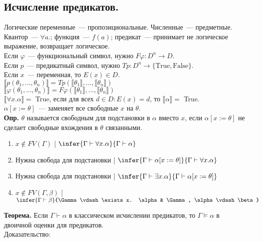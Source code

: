 \documentclass{article}
\begin{document}
	\subsection{Исчисление предикатов.}
	Логические переменные~--- пропозициональные. Численные~--- предметные. \\
	Квантор~--- $\forall a.$; функция~--- $f(a)$; предикат~--- принимает не логическое выражение, возвращает логическое. \\
	Если $\varphi$~--- функциональный символ, нужно $F\varphi: D^n \rightarrow D$. \\
	Если $p$~--- предикатный символ, нужно $Tp: D^n \rightarrow \{ \text{True}, \text{False} \}$. \\
	Если $x$~--- переменная, то $E(x) \in D$. \\
	$\llbracket p(\theta_1, \dots, \theta_n) \rrbracket = Tp(\llbracket \theta_1 \rrbracket, \dots, \llbracket \theta_n \rrbracket)$ \\
	$\llbracket \varphi (\theta_1, \dots, \theta_n) \rrbracket = F\varphi(\llbracket \theta_1 \rrbracket, \dots, \llbracket \theta_n \rrbracket)$ \\
	$\llbracket \forall x. \alpha \rrbracket =$ True, если для всех $d \in D: E(x) = d$, то $\llbracket \alpha \rrbracket =$ True. \\
	$\alpha [ x := \theta ]$~--- заменяет все свободные $x$ на $\theta$. \\
	\textbf{Опр.} $\theta$ называется свободным для подстановки в $\alpha$ вместо $x$, если $\alpha [x := \theta]$ не сделает свободные вхождения в $\theta$ связанными.
	\begin{enumerate}
		\item $x \not\in FV(\Gamma)$ | $\infer{\Gamma \vdash \forall x. \alpha}{\Gamma \vdash \alpha}$
		\item Нужна свобода для подстановки | $\infer{\Gamma \vdash \alpha [x := \theta]}{\Gamma \vdash \forall x. \alpha}$
		\item Нужна свобода для подстановки | $\infer{\Gamma \vdash \exists x. \alpha}{\Gamma \vdash \alpha [x := \theta]}$
		\item $x \not\in FV(\Gamma, \beta)$ | $\infer{\Gamma \vdash \beta}{\Gamma \vdash \exists x. \alpha & \Gamma, \alpha \vdash \beta}$
	\end{enumerate}
	\textbf{Теорема.} Если $\Gamma \vdash \alpha$ в классическом исчислении предикатов, то $\Gamma \vDash \alpha$ в двоичной оценки для предикатов. \\
	Доказательство:
\end{document}
